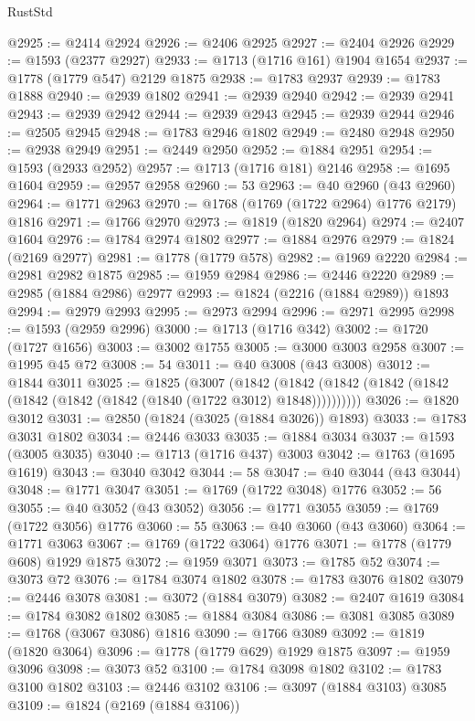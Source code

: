 \begin{lexlean}{RustStd}
\begin{coremodule}
@2925 := @2414 @2924
@2926 := @2406 @2925
@2927 := @2404 @2926
@2929 := @1593 (@2377 @2927)
@2933 := @1713 (@1716 @161) @1904 @1654
@2937 := @1778 (@1779 @547) @2129 @1875
@2938 := @1783 @2937
@2939 := @1783 @1888
@2940 := @2939 @1802
@2941 := @2939 @2940
@2942 := @2939 @2941
@2943 := @2939 @2942
@2944 := @2939 @2943
@2945 := @2939 @2944
@2946 := @2505 @2945
@2948 := @1783 @2946 @1802
@2949 := @2480 @2948
@2950 := @2938 @2949
@2951 := @2449 @2950
@2952 := @1884 @2951
@2954 := @1593 (@2933 @2952)
@2957 := @1713 (@1716 @181) @2146
@2958 := @1695 @1604
@2959 := @2957 @2958
@2960 := 53
@2963 := @40 @2960 (@43 @2960)
@2964 := @1771 @2963
@2970 := @1768 (@1769 (@1722 @2964) @1776 @2179) @1816
@2971 := @1766 @2970
@2973 := @1819 (@1820 @2964)
@2974 := @2407 @1604
@2976 := @1784 @2974 @1802
@2977 := @1884 @2976
@2979 := @1824 (@2169 @2977)
@2981 := @1778 (@1779 @578)
@2982 := @1969 @2220
@2984 := @2981 @2982 @1875
@2985 := @1959 @2984
@2986 := @2446 @2220
@2989 := @2985 (@1884 @2986) @2977
@2993 := @1824 (@2216 (@1884 @2989)) @1893
@2994 := @2979 @2993
@2995 := @2973 @2994
@2996 := @2971 @2995
@2998 := @1593 (@2959 @2996)
@3000 := @1713 (@1716 @342)
@3002 := @1720 (@1727 @1656)
@3003 := @3002 @1755
@3005 := @3000 @3003 @2958
@3007 := @1995 @45 @72
@3008 := 54
@3011 := @40 @3008 (@43 @3008)
@3012 := @1844 @3011
@3025 := @1825
    (@3007
      (@1842 (@1842 (@1842 (@1842 (@1842 (@1842 (@1842 (@1842 (@1840 (@1722 @3012) @1848))))))))))
@3026 := @1820 @3012
@3031 := @2850 (@1824 (@3025 (@1884 @3026)) @1893)
@3033 := @1783 @3031 @1802
@3034 := @2446 @3033
@3035 := @1884 @3034
@3037 := @1593 (@3005 @3035)
@3040 := @1713 (@1716 @437) @3003
@3042 := @1763 (@1695 @1619)
@3043 := @3040 @3042
@3044 := 58
@3047 := @40 @3044 (@43 @3044)
@3048 := @1771 @3047
@3051 := @1769 (@1722 @3048) @1776
@3052 := 56
@3055 := @40 @3052 (@43 @3052)
@3056 := @1771 @3055
@3059 := @1769 (@1722 @3056) @1776
@3060 := 55
@3063 := @40 @3060 (@43 @3060)
@3064 := @1771 @3063
@3067 := @1769 (@1722 @3064) @1776
@3071 := @1778 (@1779 @608) @1929 @1875
@3072 := @1959 @3071
@3073 := @1785 @52
@3074 := @3073 @72
@3076 := @1784 @3074 @1802
@3078 := @1783 @3076 @1802
@3079 := @2446 @3078
@3081 := @3072 (@1884 @3079)
@3082 := @2407 @1619
@3084 := @1784 @3082 @1802
@3085 := @1884 @3084
@3086 := @3081 @3085
@3089 := @1768 (@3067 @3086) @1816
@3090 := @1766 @3089
@3092 := @1819 (@1820 @3064)
@3096 := @1778 (@1779 @629) @1929 @1875
@3097 := @1959 @3096
@3098 := @3073 @52
@3100 := @1784 @3098 @1802
@3102 := @1783 @3100 @1802
@3103 := @2446 @3102
@3106 := @3097 (@1884 @3103) @3085
@3109 := @1824 (@2169 (@1884 @3106))

\end{coremodule}
\end{lexlean}
